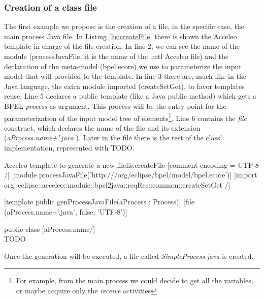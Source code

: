 \subsubsection{Creation of a class file}
The first example we propose is the creation of a file, in the specific case, the main process Java file.
In Listing \ref{lis:createFile} there is shown the Acceleo template in charge of the file creation. In line 2, we can see the name of the module (processJavaFile, it is the name of the .mtl Acceleo file) and the declaration of the meta-model (bpel.ecore) we use to parameterize the input model that will provided to the template.
In line 3 there are, much like in the Java language, the extra module imported (createSetGet), to favor templates reuse. Line 5 declares a public template (like a Java public method) which gets a BPEL \textit{process} as argument.
This process will be the entry point for the parameterization of the input model tree of elements\footnote{For example, from the main process we could decide to get all the variables, or maybe acquire only the \textit{receive} activities}. Line 6 contains the \textit{file} construct, which declares the name of the file and its extension (\textit{aProcess.name+'.java'}). Later in the file there is the rest of the class' implementation, represented with TODO.

\begin{center}
  \begin{minipage}{1\textwidth}
    \begin{java-code}{Acceleo template to generate a new file}{lis:createFile}
[comment encoding = UTF-8 /]
[module processJavaFile('http:///org/eclipse/bpel/model/bpel.ecore')]
[import org::eclipse::acceleo::module::bpel2java::reqRes::common::createSetGet /]

[template public genProcessJavaFile(aProcess : Process)]
[file (aProcess.name+'.java', false, 'UTF-8')]

public class [aProcess.name/] {
    \\ TODO 
}
    \end{java-code}
  \end{minipage}
\end{center}

Once the generation will be executed, a file called \textit{SimpleProcess.java} is created.

